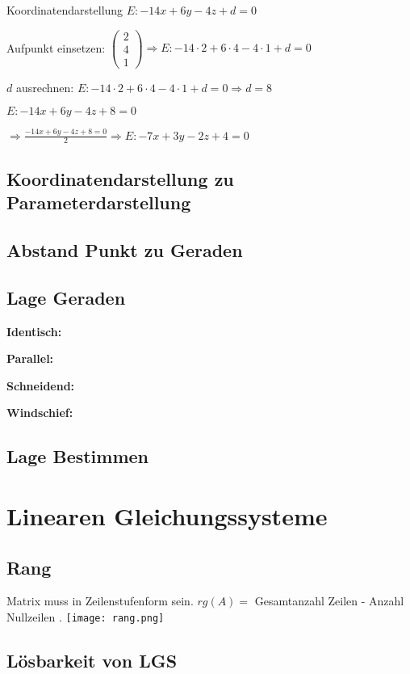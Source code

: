\begin{multicols*}{3}
 Koordinatendarstellung $ E: -14x + 6y - 4z + d = 0$

 Aufpunkt einsetzen: $\begin{pmatrix}
2\\
4\\
1
\end{pmatrix} 	\Rightarrow  E: -14 \cdot 2  + 6 \cdot 4 - 4\cdot 1 + d = 0 $

 $d$ ausrechnen: $ E: -14 \cdot 2  + 6 \cdot 4 - 4\cdot 1 + d = 0 \Rightarrow d = 8$

 $E: -14x + 6y - 4z + 8 = 0$

$\Rightarrow \frac{-14x + 6y - 4z + 8 = 0}{2} \Rightarrow E: -7x + 3y - 2z + 4 = 0$ 

\subsection{Koordinatendarstellung zu Parameterdarstellung }


\subsection{Abstand Punkt zu Geraden}

\subsection{Lage Geraden}

\textbf{Identisch:}  

\textbf{Parallel:} 

\textbf{Schneidend:}

\textbf{Windschief:} 

\subsection{Lage Bestimmen}

\section{Linearen Gleichungssysteme}
\subsection{Rang}
{Matrix muss in Zeilenstufenform sein.}
{$rg(A) = $ Gesamtanzahl Zeilen - Anzahl Nullzeilen .}
 \texttt{[image: rang.png]} 
 
\subsection{Lösbarkeit von LGS}


\end{multicols*}
